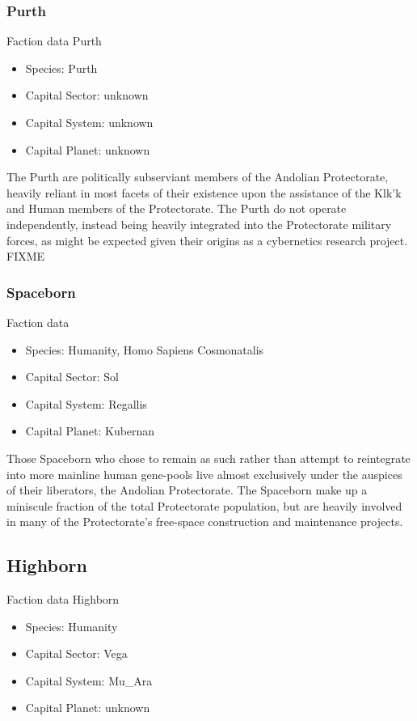\subsubsection{Purth}

Faction data Purth
\begin{itemize}
\item Species: Purth
\item Capital Sector: unknown
\item Capital System: unknown
\item Capital Planet: unknown
\end{itemize}

The Purth are politically subserviant members of the Andolian
Protectorate, heavily reliant in most facets of their existence upon
the assistance of the Klk'k and Human members of the Protectorate. The
Purth do not operate independently, instead being heavily integrated
into the Protectorate military forces, as might be expected given
their origins as a cybernetics research project.  FIXME

\subsubsection{Spaceborn}

Faction data
\begin{itemize}
\item Species: Humanity, Homo Sapiens Cosmonatalis
\item Capital Sector: Sol
\item Capital System: Regallis
\item Capital Planet: Kubernan
\end{itemize}


Those Spaceborn who chose to remain as such rather than attempt to
reintegrate into more mainline human gene-pools live almost
exclusively under the auspices of their liberators, the Andolian
Protectorate. The Spaceborn make up a miniscule fraction of the total
Protectorate population, but are heavily involved in many of the
Protectorate's free-space construction and maintenance projects.


\subsection{Highborn}

Faction data Highborn
\begin{itemize}
\item Species: Humanity
\item Capital Sector: Vega
\item Capital System: Mu\_Ara
\item Capital Planet: unknown
\end{itemize}

